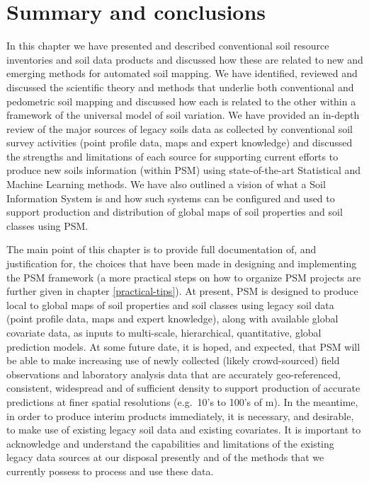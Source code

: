 \documentclass[graybox,natbib,nospthms,UStrade]{svmono}
\begin{document}
\hypertarget{summary-and-conclusions}{%
\section{Summary and conclusions}\label{summary-and-conclusions}}

In this chapter we have presented and described conventional soil
resource inventories and soil data products and discussed how these are
related to new and emerging methods for automated soil
mapping. We have identified, reviewed and discussed the scientific
theory and methods that underlie both conventional and pedometric soil
mapping and discussed how each is related to the other within a
framework of the universal model of soil variation. We have provided an
in-depth review of the major sources of legacy soils data as collected
by conventional soil survey activities (point profile data, maps and
expert knowledge) and discussed the strengths and limitations of each
source for supporting current efforts to produce new soils information
(within PSM) using state-of-the-art Statistical and Machine Learning methods.
We have also outlined a vision of what a Soil Information System is
and how such systems can be configured and used to support production
and distribution of global maps of soil properties and soil classes using PSM.

The main point of this chapter is to provide full documentation of, and
justification for, the choices that have been made in designing and
implementing the PSM framework (a more practical steps on how to organize
PSM projects are further given in chapter \ref{practical-tips}).
At present, PSM is designed to produce local to global maps of soil properties
and soil classes using legacy soil data (point profile data, maps
and expert knowledge), along with available
global covariate data, as inputs to multi-scale, hierarchical,
quantitative, global prediction models. At some future date, it is
hoped, and expected, that PSM will be able to make increasing use of
newly collected (likely crowd-sourced) field observations and laboratory
analysis data that are accurately geo-referenced, consistent, widespread
and of sufficient density to support production of accurate predictions
at finer spatial resolutions (e.g.~10's to 100's of m). In the meantime,
in order to produce interim products immediately, it is necessary, and
desirable, to make use of existing legacy soil data and existing
covariates. It is important to acknowledge and understand the capabilities
and limitations of the existing legacy data sources at our disposal presently
and of the methods that we currently possess to process and use these data.
\end{document}
